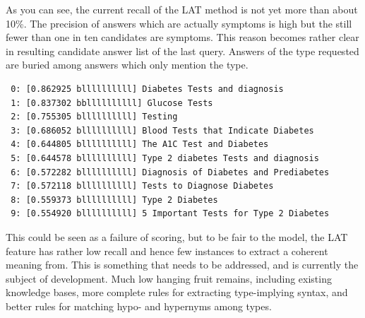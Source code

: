 \documentclass[12pt,letterpaper]{article}
\begin{document}
As you can see, the current recall of the LAT method is not yet more than about 10\%. The precision of answers which are actually symptoms is high but the still fewer than one in ten candidates are symptoms. This reason becomes rather clear in resulting candidate answer list of the last query. Answers of the type requested are buried among answers which only mention the type.

\begin{verbatim}
 0: [0.862925 bllllllllll] Diabetes Tests and diagnosis
 1: [0.837302 bbllllllllll] Glucose Tests
 2: [0.755305 bllllllllll] Testing
 3: [0.686052 bllllllllll] Blood Tests that Indicate Diabetes
 4: [0.644805 bllllllllll] The A1C Test and Diabetes
 5: [0.644578 bllllllllll] Type 2 diabetes Tests and diagnosis
 6: [0.572282 bllllllllll] Diagnosis of Diabetes and Prediabetes
 7: [0.572118 bllllllllll] Tests to Diagnose Diabetes
 8: [0.559373 bllllllllll] Type 2 Diabetes
 9: [0.554920 bllllllllll] 5 Important Tests for Type 2 Diabetes
\end{verbatim}

This could be seen as a failure of scoring, but to be fair to the model, the LAT feature has rather low recall and hence few instances to extract a coherent meaning from. This is something that needs to be addressed, and is currently the subject of development. Much low hanging fruit remains, including existing knowledge bases, more complete rules for extracting type-implying syntax, and better rules for matching hypo- and hypernyms among types. 
\end{document}
